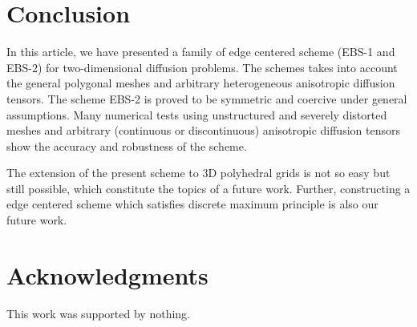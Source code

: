 \documentclass[times,review,preprint,authoryear]{elsarticle}
\begin{document}
\section{Conclusion}\label{sec6}

In this article, we have presented a family of edge centered scheme (EBS-1 and EBS-2) for two-dimensional diffusion problems.
The schemes takes into account the general polygonal meshes and arbitrary heterogeneous anisotropic diffusion tensors.
The scheme EBS-2 is proved to be symmetric and coercive under general assumptions.
Many numerical tests using unstructured and severely distorted meshes and arbitrary (continuous or discontinuous) anisotropic diffusion tensors show the accuracy and robustness of the scheme.

The extension of the present scheme to 3D polyhedral grids is not so easy but still possible, which constitute the topics of a future work.
Further, constructing a edge centered scheme which satisfies discrete maximum principle is also our future work.

\section*{Acknowledgments}

This work was supported by nothing.
\end{document}
